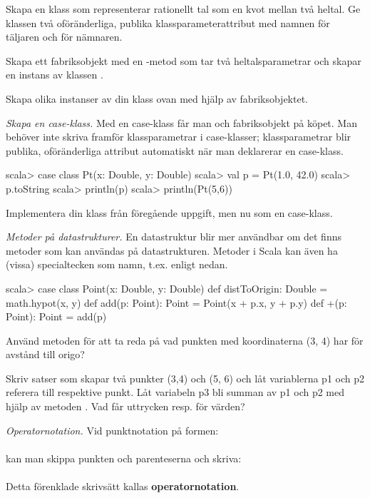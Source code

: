 \Subtask Skapa en klass  som representerar rationellt tal som en kvot mellan två heltal. Ge klassen två oföränderliga, publika klassparameterattribut med namnen  för täljaren och  för nämnaren. 

\Subtask Skapa ett fabriksobjekt med en -metod som tar två heltalsparametrar och skapar en instans av klassen .

\Subtask Skapa olika instanser av din klass  ovan med hjälp av fabriksobjektet.


\Task \emph{Skapa en case-klass.} Med en case-klass får man  och fabriksobjekt på köpet. Man behöver inte skriva  framför klassparametrar i case-klasser; klassparametrar blir publika, oföränderliga attribut automatiskt när man deklarerar en case-klass.

\begin{REPL}
scala> case class Pt(x: Double, y: Double) 
scala> val p = Pt(1.0, 42.0)
scala> p.toString
scala> println(p)
scala> println(Pt(5,6))
\end{REPL}

\Subtask Implementera din klass  från föregående uppgift, men nu som en case-klass.
	
\Task \label{task:point} \emph{Metoder på datastrukturer.} En datastruktur blir mer användbar om det finns metoder som kan användas på datastrukturen. Metoder i Scala kan även ha (vissa) specialtecken som namn, t.ex. \code{+} enligt nedan.  
\begin{REPL}
scala> case class Point(x: Double, y: Double) {
         def distToOrigin: Double = math.hypot(x, y)   
         def add(p: Point): Point = Point(x + p.x, y + p.y)
         def +(p: Point): Point = add(p)
       }
\end{REPL}

\Subtask Använd metoden  för att ta reda på vad punkten med koordinaterna (3, 4) har för avstånd till origo?

\Subtask Skriv satser som skapar två punkter (3,4) och (5, 6) och låt variablerna p1 och p2 referera till respektive punkt. Låt variabeln p3 bli summan av p1 och p2 med hjälp av metoden . Vad får uttrycken  resp.  för värden?



\Task \emph{Operatornotation.} Vid punktnotation på formen: \\  \\ kan man skippa punkten och parenteserna och skriva:\\   \\
Detta förenklade skrivsätt kallas \textbf{operatornotation}.

